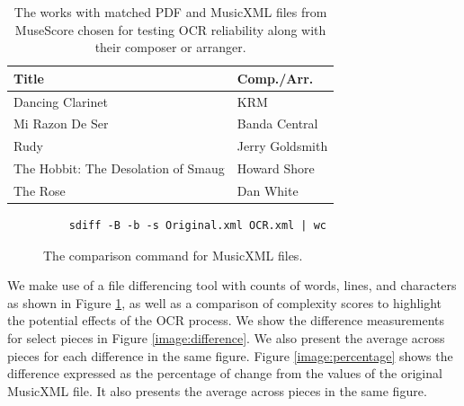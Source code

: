 \documentclass[10pt,preprint]{sigplanconf}
\begin{document}
\begin{table}[ht!]
	\centering
    \begin{tabular}{| l | l |}
        \hline
    Title & Comp./Arr. \\ \hline
    Dancing Clarinet & KRM \\ \hline
	Mi Razon De Ser & Banda Central \\ \hline
	Rudy & Jerry Goldsmith \\ \hline
	The Hobbit: The Desolation of Smaug & Howard Shore \\ \hline
	The Rose & Dan White \\
        \hline
    \end{tabular}
	\caption{The works with matched PDF and MusicXML files from MuseScore chosen for testing OCR reliability along with their composer or arranger.}
	\label{table:matched}
\end{table} 


\begin{figure}[ht!]
	\centering
	\lstset{language=bash} 
    \begin{lstlisting}
    sdiff -B -b -s Original.xml OCR.xml | wc
    \end{lstlisting}
    \caption{The comparison command for MusicXML files.}
    \label{image:sdiff}
\end{figure}

We make use of a file differencing tool with counts of words, lines, and characters as shown in Figure \ref{image:sdiff}, as well as a comparison of complexity scores to highlight the potential effects of the OCR process. We show the difference measurements for select pieces in Figure \ref{image:difference}. We also present the average across pieces for each difference in the same figure. Figure \ref{image:percentage} shows the difference expressed as the percentage of change from the values of the original MusicXML file. It also presents the average across pieces in the same figure.

\end{document}

